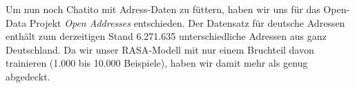 Um nun noch Chatito mit Adress-Daten zu füttern, haben wir uns für das Open-Data Projekt \textit{Open Addresses} entschieden. Der Datensatz für deutsche Adressen enthält zum derzeitigen Stand 6.271.635 unterschiedliche Adressen aus ganz Deutschland. Da wir unser RASA-Modell mit nur einem Bruchteil davon trainieren (1.000 bis 10.000 Beispiele), haben wir damit mehr als genug abgedeckt.
